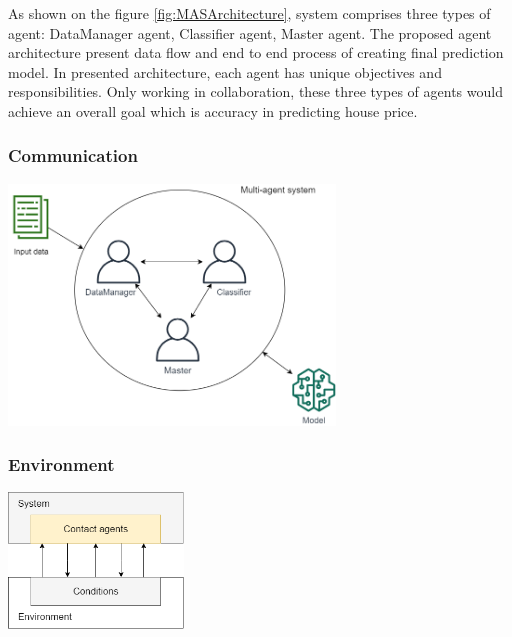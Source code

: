 As shown on the figure \ref{fig:MASArchitecture}, system comprises three types of agent: DataManager agent, Classifier agent, Master agent. The proposed agent architecture present data flow and end to end process of creating final prediction model. In presented architecture, each agent has unique objectives and responsibilities. Only working in collaboration, these three types of agents would achieve an overall goal which is accuracy in predicting house price. 


\subsubsection{Communication}

\begin{center}
	\includegraphics[width=0.65\textwidth, keepaspectratio]{diagrams/architecture}
	\center
	\label{fig:MASArchitecture}
\end{center}


\subsubsection{Environment}

\begin{center}
	\includegraphics[width=0.35\textwidth, keepaspectratio]{diagrams/env-contact-agents}
	\center
	\label{fig:env-contact-agents}
\end{center}


